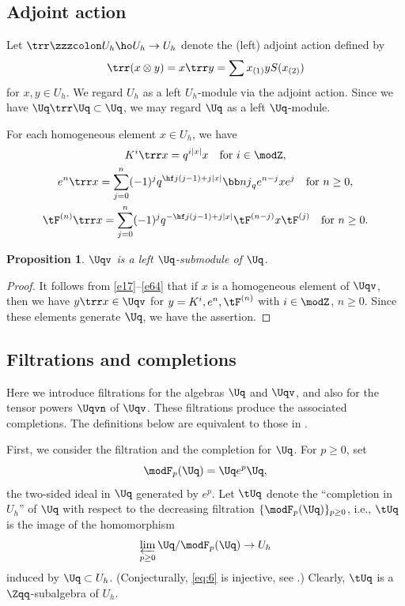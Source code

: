 \documentclass{amsart}
\numberwithin{equation}{section}
\numberwithin{figure}{section}
\theoremstyle{plain}
\newtheorem{proposition}[theorem]{Proposition}
\theoremstyle{definition}
\theoremstyle{remark}
\begin{document}
\subsection{Adjoint action}
\label{sec:adjoint-action}
Let $\trr\zzzcolon U_h\ho U_h \rightarrow U_h$ denote the (left) adjoint action defined
by
\begin{equation*}
  \trr(x\otimes y)=x \trr y = \sum x_{(1)} y S(x_{(2)})
\end{equation*}
for $x,y\in U_h$.  We regard $U_h$ as a left $U_h$-module via the
adjoint action.  Since we have $\Uq\trr\Uq\subset \Uq$, we may regard $\Uq$
as a left $\Uq$-module.

For each homogeneous element $x\in U_h$, we have
\begin{gather}
  \label{e17}
  K^i\trr x = q^{i|x|} x\quad \text{for $i\in \modZ $},\\
  \label{e24}
  e^n\trr x =
  \sum_{j=0}^n (-1)^j q^{\hf j(j-1)+j|x|} {\bb nj}_q e^{n-j}x e^j
  \quad \text{for $n\ge 0$},\\
  \label{e64}
  \tF^{(n)}\trr x =
  \sum_{j=0}^n (-1)^j q^{-\hf j(j-1)+j|x|}\tF^{(n-j)}x\tF^{(j)}
  \quad \text{for $n\ge 0$}.
\end{gather}

\begin{proposition}
  \label{thm:19}
  $\Uqv$ is a left $\Uq$-submodule of $\Uq$.
\end{proposition}

\begin{proof}
  It follows from \eqref{e17}--\eqref{e64} that if $x$
  is a homogeneous element of $\Uqv$, then we have $y\trr x\in \Uqv$ for
  $y=K^i,e^n,\tF^{(n)}$ with $i\in \modZ $, $n\ge 0$.  Since these elements
  generate $\Uq$, we have the assertion.
\end{proof}

\subsection{Filtrations and completions}
\label{sec:filtration-completion}

Here we introduce filtrations for the algebras $\Uq$ and $\Uqv$, and
also for the tensor powers $\Uqvn$ of $\Uqv$.  These filtrations
produce the associated completions.  The definitions below are
equivalent to those in \cite{H:uqsl2}.

First, we consider the filtration and the completion for $\Uq$.  For
$p\ge 0$, set
\begin{equation*}
  \modF _p(\Uq)=\Uq e^p\Uq,
\end{equation*}
the two-sided ideal in $\Uq$ generated by $e^p$.  Let $\tUq$ denote
the ``completion in $U_h$'' of $\Uq$ with respect to the decreasing
filtration $\{\modF _p(\Uq)\}_{p\ge 0}$, i.e., $\tUq$ is the image of the
homomorphism
\begin{equation}
  \label{eq:6}
  \varprojlim_{p\ge 0} \Uq/\modF _p(\Uq) \rightarrow  U_h
\end{equation}
induced by $\Uq\subset U_h$.  (Conjecturally, \eqref{eq:6} is injective, see
\cite[Conjecture 7.2]{H:uqsl2}.) Clearly, $\tUq$ is a
$\Zqq$-subalgebra of $U_h$.
\end{document}
